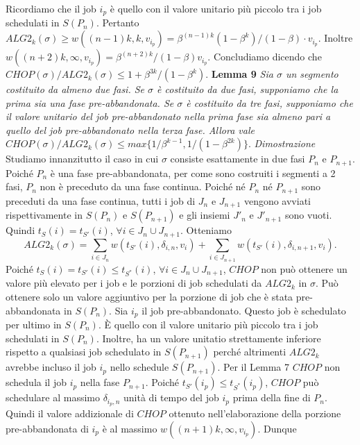 \documentclass[12pt]{article}
\begin{document}
Ricordiamo che il job $i_{p}$ è quello con il valore unitario più piccolo tra i job schedulati in $S(P_{n})$. Pertanto $ALG2_{k}(\sigma) \geq w((n - 1) k, k, v_{i_{p}}) = \beta^{(n - 1)k} (1 - \beta^{k}) / (1 -\beta) \cdot v_{i_{p}}$. Inoltre $w((n + 2) k, \infty, v_{i_{p}}) = \beta^{(n + 2) k} / (1 - \beta) v_{i_{p}}$. Concludiamo dicendo che $CHOP(\sigma) / ALG2_{k}(\sigma) \leq 1 + \beta^{3k} / (1 - \beta^{k})$.
\newline \newline
\textbf{Lemma 9}
\textit{Sia $\sigma$ un segmento costituito da almeno due fasi. Se $\sigma$ è costituito da due fasi, supponiamo che la prima sia una fase pre-abbandonata. Se $\sigma$ è costituito da tre fasi, supponiamo che il valore unitario del job pre-abbandonato nella prima fase sia almeno pari a quello del job pre-abbandonato nella terza fase. Allora vale $CHOP(\sigma) / ALG2_{k}(\sigma) \leq max\{1 / \beta^{k - 1}, 1 / (1 - \beta^{2k})\}.$}
\newline \newline
\textit{Dimostrazione}
Studiamo innanzitutto il caso in cui $\sigma$ consiste esattamente in due fasi $P_{n}$ e $P_{n+1}$. Poiché $P_{n}$ è una fase pre-abbandonata, per come sono costruiti i segmenti a 2 fasi, $P_{n}$ non è preceduto da una fase continua. Poiché né $P_{n}$ né $P_{n+1}$ sono preceduti da una fase continua, tutti i job di $J_{n}$ e $J_{n+1}$ vengono avviati rispettivamente in $S(P_{n})$ e $S(P_{n+1})$ e gli insiemi $J'_{n}$ e $J'_{n+1}$ sono vuoti. Quindi $t_{S}(i) = t_{S'}(i)$, $\forall i \in J_{n} \cup J_{n+1}$. Otteniamo
\begin{equation}
ALG2_{k} (\sigma) = \sum_{i \in J_{n}} w (t_{S'}(i), \delta_{i,n}, v_{i}) + \sum_{i \in J_{n + 1}} w (t_{S'}(i), \delta_{i, n + 1}, v_{i}). \tag*{(1)}
\end{equation}
Poiché $t_{S}(i) = t_{S'}(i) \leq t_{S^{*}}(i)$, $\forall i \in J_{n} \cup J_{n+1}$, $CHOP$ non può ottenere un valore più elevato per i job e le porzioni di job schedulati da $ALG2_{k}$ in $\sigma$. Può ottenere solo un valore aggiuntivo per la porzione di job che è stata pre-abbandonata in $S(P_{n})$. Sia $i_{p}$ il job pre-abbandonato. Questo job è schedulato per ultimo in $S(P_{n})$. È quello con il valore unitario più piccolo tra i job schedulati in $S(P_{n})$. Inoltre, ha un valore unitatio strettamente inferiore rispetto a qualsiasi job schedulato in $S(P_{n+1})$ perché altrimenti $ALG2_{k}$ avrebbe incluso il job $i_{p}$ nello schedule $S(P_{n+1})$. Per il Lemma 7 $CHOP$ non schedula il job $i_{p}$ nella fase $P_{n+1}$. Poiché $t_{S'}(i_{p}) \leq t_{S^{*}}(i_{p})$, $CHOP$ può schedulare al massimo $\delta_{i_{p}, n}$ unità di tempo del job $i_{p}$ prima della fine di $P_{n}$. Quindi il valore addizionale di $CHOP$ ottenuto nell'elaborazione della porzione pre-abbandonata di $i_{p}$ è al massimo $w((n + 1) k, \infty, v_{i_{p}})$. Dunque
\end{document}
